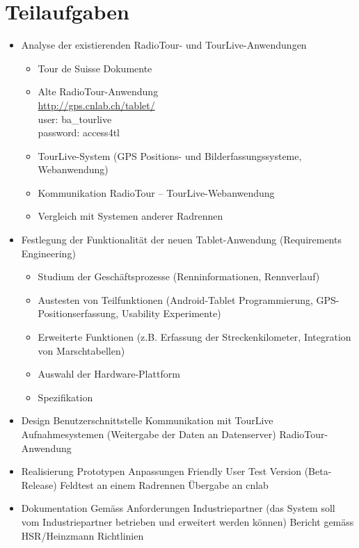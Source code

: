\section*{Teilaufgaben}
\begin{itemize}
\item Analyse der existierenden RadioTour- und TourLive-Anwendungen
\begin{itemize}
\item Tour de Suisse Dokumente
\item Alte RadioTour-Anwendung\\
\url{http://gps.cnlab.ch/tablet/}\\
user: ba\_tourlive\\
password: access4tl
\item TourLive-System (GPS Positions- und Bilderfassungssysteme, Webanwendung)
\item Kommunikation RadioTour – TourLive-Webanwendung
\item Vergleich mit Systemen anderer Radrennen 
\end{itemize}

\item Festlegung der Funktionalität der neuen Tablet-Anwendung (Requirements Engineering)
\begin{itemize}
\item Studium der Geschäftsprozesse (Renninformationen, Rennverlauf)
\item Austesten von Teilfunktionen (Android-Tablet Programmierung, GPS-Positionserfassung, Usability Experimente)
\item Erweiterte Funktionen (z.B. Erfassung der Streckenkilometer, Integration von Marschtabellen)
\item Auswahl der Hardware-Plattform
\item Spezifikation
\end{itemize}

\item Design
Benutzerschnittstelle
Kommunikation mit TourLive Aufnahmesystemen (Weitergabe der Daten an Datenserver)
RadioTour-Anwendung

\item Realisierung
Prototypen
Anpassungen
Friendly User Test Version (Beta-Release)
Feldtest an einem Radrennen
Übergabe an cnlab

\item Dokumentation
Gemäss Anforderungen Industriepartner (das System soll vom Industriepartner betrieben und erweitert werden können)
Bericht gemäss HSR/Heinzmann Richtlinien
\end{itemize}


